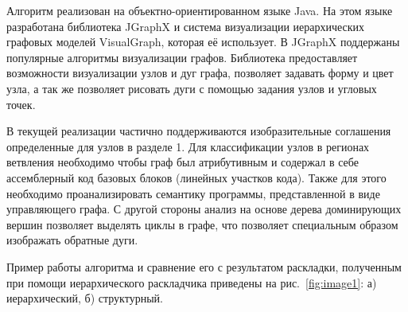 \documentclass{jctart15a}
\begin{document}
Алгоритм реализован на объектно-ориентированном языке Java. На этом языке разработана библиотека JGraphX и система визуализации иерархических графовых моделей VisualGraph, которая её использует. В JGraphX поддержаны популярные алгоритмы визуализации графов. Библиотека предоставляет возможности визуализации узлов и дуг графа, позволяет задавать форму и цвет узла, а так же позволяет рисовать дуги с помощью задания узлов и угловых точек.

В текущей реализации частично поддерживаются изобразительные соглашения определенные для узлов в разделе 1. Для классификации узлов в регионах ветвления необходимо чтобы граф был атрибутивным и содержал в себе ассемблерный код базовых блоков (линейных участков кода). Также для этого необходимо проанализировать семантику программы, представленной в виде управляющего графа. С другой стороны анализ на основе дерева доминирующих вершин позволяет выделять циклы в графе, что позволяет специальным образом изображать обратные дуги.

Пример работы алгоритма и сравнение его с результатом раскладки, полученным при помощи иерархического раскладчика приведены на рис.~\ref{fig:image1}: а) иерархический, б) структурный.
\end{document}

